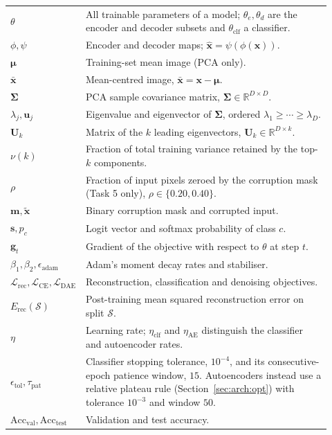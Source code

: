 \documentclass[11pt,a4paper]{article}
\newcommand{\R}{\mathbb{R}}\newcommand{\given}{\mid}\newcommand{\Acc}{\mathrm{Acc}}
\begin{document}
\begin{table}[htbp]
\begin{tabular}{@{}p{0.10\linewidth}p{0.82\linewidth}@{}}
$\theta$ & All trainable parameters of a model; $\theta_e,\theta_d$ are the encoder and decoder
      subsets and $\theta_{\mathrm{clf}}$ a classifier. \\
$\phi,\psi$ & Encoder and decoder maps; $\hat{\mathbf{x}}=\psi(\phi(\mathbf{x}))$. \\
$\boldsymbol{\mu}$ & Training-set mean image (PCA only). \\
$\bar{\mathbf{x}}$ & Mean-centred image, $\bar{\mathbf{x}}=\mathbf{x}-\boldsymbol{\mu}$. \\
$\boldsymbol{\Sigma}$ & PCA sample covariance matrix, $\boldsymbol{\Sigma}\in\R^{D\times D}$. \\
$\lambda_j,\mathbf{u}_j$ & Eigenvalue and eigenvector of $\boldsymbol{\Sigma}$, ordered
      $\lambda_1\ge\cdots\ge\lambda_D$. \\
$\mathbf{U}_k$ & Matrix of the $k$ leading eigenvectors, $\mathbf{U}_k\in\R^{D\times k}$. \\
$\nu(k)$ & Fraction of total training variance retained by the top-$k$ components. \\
$\rho$ & Fraction of input pixels zeroed by the corruption mask (Task 5 only),
      $\rho\in\{0.20,0.40\}$. \\
$\mathbf{m},\tilde{\mathbf{x}}$ & Binary corruption mask and corrupted input. \\
$\mathbf{s},p_c$ & Logit vector and softmax probability of class $c$. \\
$\mathbf{g}_t$ & Gradient of the objective with respect to $\theta$ at step $t$. \\
$\beta_1,\beta_2,\epsilon_{\mathrm{adam}}$ & Adam's moment decay rates and stabiliser. \\
$\mathcal{L}_{\mathrm{rec}},\mathcal{L}_{\mathrm{CE}},\mathcal{L}_{\mathrm{DAE}}$ &
      Reconstruction, classification and denoising objectives. \\
$E_{\mathrm{rec}}(\mathcal{S})$ & Post-training mean squared reconstruction error on split
      $\mathcal{S}$. \\
$\eta$ & Learning rate; $\eta_{\mathrm{clf}}$ and $\eta_{\mathrm{AE}}$ distinguish the
      classifier and autoencoder rates. \\
$\epsilon_{\mathrm{tol}},\tau_{\mathrm{pat}}$ & Classifier stopping tolerance, $10^{-4}$, and its
      consecutive-epoch patience window, $15$.  Autoencoders instead use a relative plateau rule
      (Section~\ref{sec:arch:opt}) with tolerance $10^{-3}$ and window $50$. \\
$\Acc_{\mathrm{val}},\Acc_{\mathrm{test}}$ & Validation and test accuracy. \\
\bottomrule
\end{tabular}
\end{table}
\end{document}
